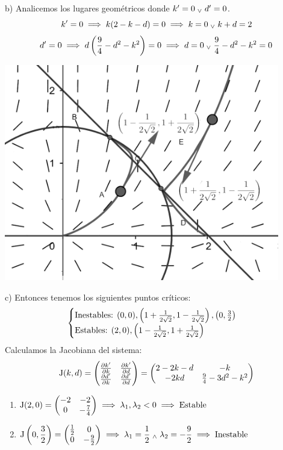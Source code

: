 b) Analicemos los lugares geométricos donde $k'=0 \; _{\vee} \; d'=0$.
\[k'=0 \implies k(2-k-d) = 0 \implies k = 0 \; _{\vee} \; k+d = 2\]
\[d'=0 \implies d\left(\frac{9}{4} - d^2 - k^2\right) = 0 \implies d = 0 \; _{\vee} \; \frac{9}{4} - d^2 - k^2 = 0\]
\begin{center}
	\includegraphics[width=12cm]{img/diam3-8_contodo.png}
\end{center}

c) Entonces tenemos los siguientes puntos críticos:
\[\begin{cases}
		\text{Inestables: } (0,0), \left(1+\frac{1}{2\sqrt{2}}, 1-\frac{1}{2\sqrt{2}}\right), \left(0,\frac{3}{2}\right) \\
		\text{Estables: } (2,0), \left(1-\frac{1}{2\sqrt{2}}, 1+\frac{1}{2\sqrt{2}}\right)
	\end{cases}\]
Calculamos la Jacobiana del sistema:
\[\operatorname{J}(k, d) = \begin{pmatrix}
		\pdv{k'}{k} & \pdv{k'}{d} \\
		\pdv{d'}{k} & \pdv{d'}{d}
	\end{pmatrix} = \begin{pmatrix}
		2-2k-d & -k                       \\
		-2kd   & \frac{9}{4} - 3d^2 - k^2
	\end{pmatrix}\]
\begin{enumerate}
	\item $\displaystyle \operatorname{J}(2,0) = \begin{pmatrix}
			      -2 & -2           \\
			      0  & -\frac{7}{4}
		      \end{pmatrix} \implies \lambda_1, \lambda_2 < 0 \implies \text{Estable}$
	\item $\displaystyle \operatorname{J}\left(0, \frac{3}{2}\right) = \begin{pmatrix}
			      \frac{1}{2} & 0            \\
			      0           & -\frac{9}{2}
		      \end{pmatrix} \implies \lambda_1 = \frac{1}{2} \; _{\wedge} \; \lambda_2 = -\frac{9}{2} \implies \text{Inestable}$
\end{enumerate}


